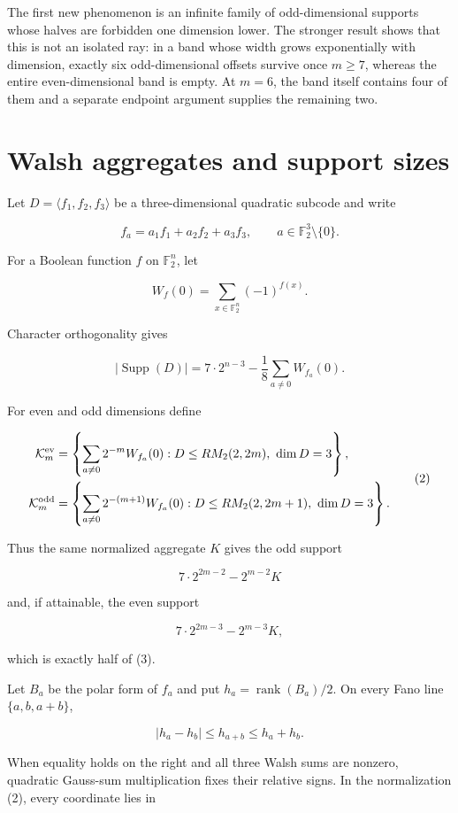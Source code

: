 \documentclass[11pt]{article}
\begin{document}
The first new phenomenon is an infinite family of odd-dimensional supports whose halves are
forbidden one dimension lower. The stronger result shows that this is not an isolated ray: in a
band whose width grows exponentially with dimension, exactly six odd-dimensional offsets survive
once $m\geq7$, whereas the entire even-dimensional band is empty. At $m=6$, the band itself
contains four of them and a separate endpoint argument supplies the remaining two.

\section{Walsh aggregates and support sizes}


Let $D=\langle f_1,f_2,f_3\rangle$ be a three-dimensional quadratic subcode and write

\[
f_a=a_1f_1+a_2f_2+a_3f_3,
\qquad a\in\mathbb F_2^3\setminus\{0\}.
\]

For a Boolean function $f$ on $\mathbb F_2^n$, let

\[
W_f(0)=\sum_{x\in\mathbb F_2^n}(-1)^{f(x)}.
\]

Character orthogonality gives

\[
|\operatorname{Supp}(D)|
=7\cdot2^{n-3}-\frac18\sum_{a\ne0}W_{f_a}(0).
\tag{1}
\]

For even and odd dimensions define

\[
\begin{aligned}
\mathcal K_m^{\rm ev}
&=\left\{\sum_{a\ne0}2^{-m}W_{f_a}(0):
 D\leq RM_2(2,2m),\ \dim D=3\right\},\\
\mathcal K_m^{\rm odd}
&=\left\{\sum_{a\ne0}2^{-(m+1)}W_{f_a}(0):
 D\leq RM_2(2,2m+1),\ \dim D=3\right\}.
\end{aligned}
\tag{2}
\]

Thus the same normalized aggregate $K$ gives the odd support

\[
7\cdot2^{2m-2}-2^{m-2}K
\tag{3}
\]

and, if attainable, the even support

\[
7\cdot2^{2m-3}-2^{m-3}K,
\tag{4}
\]

which is exactly half of (3).

Let $B_a$ be the polar form of $f_a$ and put
$h_a=\operatorname{rank}(B_a)/2$. On every Fano line $\{a,b,a+b\}$,

\[
|h_a-h_b|\leq h_{a+b}\leq h_a+h_b.
\tag{5}
\]

When equality holds on the right and all three Walsh sums are nonzero, quadratic Gauss-sum
multiplication fixes their relative signs. In the normalization (2), every coordinate lies in
\end{document}
